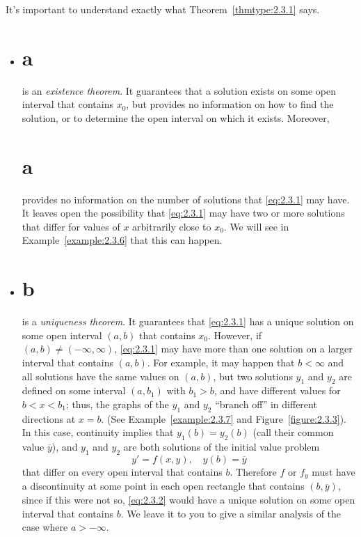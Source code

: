 It's important to understand exactly what Theorem~\ref{thmtype:2.3.1} says.

\begin{itemize}
  \item \part{a} is an {\color{blue}\it existence theorem\/}. It guarantees that a solution exists
        on some open interval that contains $x_{0}$, but provides no information on how to find the
        solution, or to determine the open interval on which it exists. Moreover, \part{a} provides
        no information on the number of solutions that \eqref{eq:2.3.1} may have. It leaves open the
        possibility that \eqref{eq:2.3.1} may have two or more solutions that differ for values of
        $x$ arbitrarily close to $x_{0}$. We will see in Example~\ref{example:2.3.6} that this can
        happen.

  \item \part{b} is a {\color{blue}\it uniqueness theorem\/}. It guarantees that \eqref{eq:2.3.1}
        has a unique solution on some open interval $(a,b)$ that contains $x_{0}$. However, if
        $(a,b)\ne(-\infty,\infty)$, \eqref{eq:2.3.1} may have more than one solution on a larger
        interval that contains $(a,b)$. For example, it may happen that $b<\infty$ and all solutions
        have the same values on $(a,b)$, but two solutions $y_{1}$ and $y_{2}$ are defined on some
        interval $(a,b_{1})$ with $b_{1}>b$, and have different values for $b<x<b_{1}$; thus, the
        graphs of the $y_{1}$ and $y_{2}$ ``branch off'' in different directions at $x=b$. (See
        Example~\ref{example:2.3.7} and Figure~\ref{figure:2.3.3}). In this case, continuity implies
        that $y_{1}(b)=y_{2}(b)$ (call their common value $\overline{y}$), and $y_{1}$ and $y_{2}$
        are both solutions of the initial value problem
    \begin{equation}
      \label{eq:2.3.2}y'=f(x,y),\quad y(b)=\overline{y}
    \end{equation}
    that differ on every open interval that contains $b$. Therefore $f$ or $f_{y}$ must have a
    discontinuity at some point in each open rectangle that contains $(b,\overline{y})$, since if
    this were not so, \eqref{eq:2.3.2} would have a unique solution on some open interval that
    contains $b$. We leave it to you to give a similar analysis of the case where $a>-\infty$.
\end{itemize}

